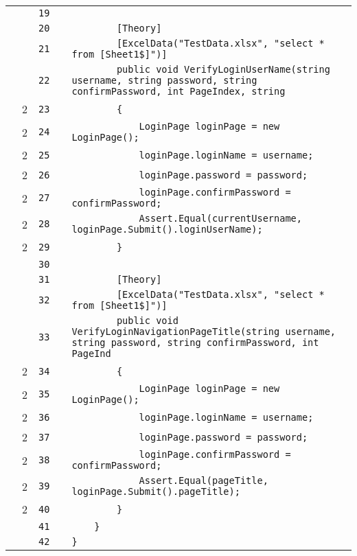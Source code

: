 \documentclass[a4paper,landscape,10pt]{article}
\begin{document}
\begin{longtable}[l]{lrrll}
\cellcolor{gray} &  & \verb~19~ & & \verb~~\\
\cellcolor{gray} &  & \verb~20~ & & \verb~        [Theory]~\\
\cellcolor{gray} &  & \verb~21~ & & \verb~        [ExcelData("TestData.xlsx", "select * from [Sheet1$]")]~\\
\cellcolor{gray} &  & \verb~22~ & & \verb~        public void VerifyLoginUserName(string username, string password, string confirmPassword, int PageIndex, string ~\\
\cellcolor{green} & 2 & \verb~23~ & & \verb~        {~\\
\cellcolor{green} & 2 & \verb~24~ & & \verb~            LoginPage loginPage = new LoginPage();~\\
\cellcolor{green} & 2 & \verb~25~ & & \verb~            loginPage.loginName = username;~\\
\cellcolor{green} & 2 & \verb~26~ & & \verb~            loginPage.password = password;~\\
\cellcolor{green} & 2 & \verb~27~ & & \verb~            loginPage.confirmPassword = confirmPassword;~\\
\cellcolor{green} & 2 & \verb~28~ & & \verb~            Assert.Equal(currentUsername, loginPage.Submit().loginUserName);~\\
\cellcolor{green} & 2 & \verb~29~ & & \verb~        }~\\
\cellcolor{gray} &  & \verb~30~ & & \verb~~\\
\cellcolor{gray} &  & \verb~31~ & & \verb~        [Theory]~\\
\cellcolor{gray} &  & \verb~32~ & & \verb~        [ExcelData("TestData.xlsx", "select * from [Sheet1$]")]~\\
\cellcolor{gray} &  & \verb~33~ & & \verb~        public void VerifyLoginNavigationPageTitle(string username, string password, string confirmPassword, int PageInd~\\
\cellcolor{green} & 2 & \verb~34~ & & \verb~        {~\\
\cellcolor{green} & 2 & \verb~35~ & & \verb~            LoginPage loginPage = new LoginPage();~\\
\cellcolor{green} & 2 & \verb~36~ & & \verb~            loginPage.loginName = username;~\\
\cellcolor{green} & 2 & \verb~37~ & & \verb~            loginPage.password = password;~\\
\cellcolor{green} & 2 & \verb~38~ & & \verb~            loginPage.confirmPassword = confirmPassword;~\\
\cellcolor{green} & 2 & \verb~39~ & & \verb~            Assert.Equal(pageTitle, loginPage.Submit().pageTitle);~\\
\cellcolor{green} & 2 & \verb~40~ & & \verb~        }~\\
\cellcolor{gray} &  & \verb~41~ & & \verb~    }~\\
\cellcolor{gray} &  & \verb~42~ & & \verb~}~\\
\end{longtable}
\end{document}
